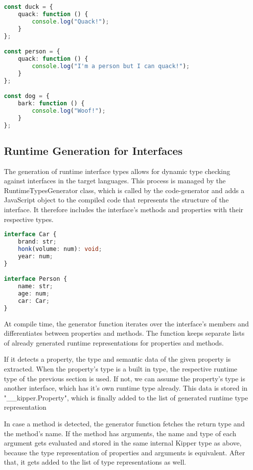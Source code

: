 \begin{lstlisting}[language=Typescript,caption=Example of duck typing in JavaScript,label=lst:implementation:javascriptducktyping]
const duck = {
	quack: function () {
		console.log("Quack!");
	}
};

const person = {
	quack: function () {
		console.log("I'm a person but I can quack!");
	}
};

const dog = {
	bark: function () {
		console.log("Woof!");
	}
};
\end{lstlisting}

\subsection{Runtime Generation for Interfaces}
The generation of runtime interface types allows for dynamic type checking against interfaces in the target languages. This process is managed by the RuntimeTypesGenerator class, which is called by the code-generator and adds a JavaScript object to the compiled code that represents the structure of the interface. It therefore includes the interface's methods and properties with their respective types.

\begin{lstlisting}[language=Typescript,caption=Example interfaces in the Kipper language,label=lst:implementation:inputinterface]
interface Car {
	brand: str;
	honk(volume: num): void;
	year: num;
}

interface Person {
	name: str;
	age: num;
	car: Car;
}
\end{lstlisting}

 At compile time, the generator function iterates over the interface's members and differentiates between properties and methods. The function keeps separate lists of already generated runtime representations for properties and methods.
 
 If it detects a property, the type and semantic data of the given property is extracted. When the property's type is a built in type, the respective runtime type of the previous section is used. If not, we can assume the property's type is another interface, which has it's own runtime type already. This data is stored in "\_\_kipper.Property", which is finally added to the list of generated runtime type representation
 
 In case a method is detected, the generator function fetches the return type and the method's name. If the method has arguments, the name and type of each argument gets evaluated and stored in the same internal Kipper type as above, because the type representation of properties and arguments is equivalent. After that, it gets added to the list of type representations as well.

